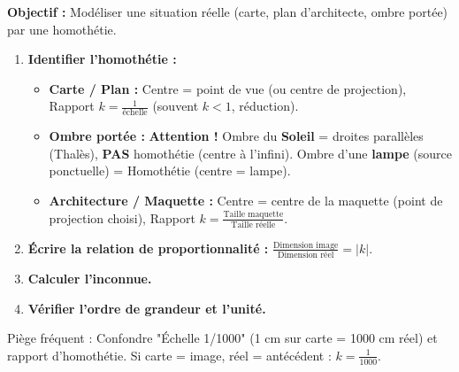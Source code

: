 \documentclass[11pt]{article}
\newcommand{\cle}[1]{{\popxbold\color{popdark}#1}}
\begin{document}
\begin{methode}
\textbf{Objectif :} Modéliser une situation réelle (carte, plan d'architecte, ombre portée) par une homothétie.
\begin{enumerate}
    \item \textbf{Identifier l'homothétie :}
    \begin{itemize}
        \item \textbf{Carte / Plan :} Centre = point de vue (ou centre de projection), Rapport $k = \frac{1}{\text{échelle}}$ (souvent $k < 1$, réduction).
        \item \textbf{Ombre portée :} \textbf{Attention !} Ombre du \textbf{Soleil} = droites parallèles (Thalès), \textbf{PAS} homothétie (centre à l'infini). Ombre d'une \textbf{lampe} (source ponctuelle) = Homothétie (centre = lampe).
        \item \textbf{Architecture / Maquette :} Centre = centre de la maquette (point de projection choisi), Rapport $k = \frac{\text{Taille maquette}}{\text{Taille réelle}}$.
    \end{itemize}
    \item \textbf{Écrire la relation de proportionnalité :} $\frac{\text{Dimension image}}{\text{Dimension réel}} = |k|$.
    \item \textbf{Calculer l'inconnue.}
    \item \textbf{Vérifier l'ordre de grandeur et l'unité.}
\end{enumerate}
\cle{Piège fréquent} : Confondre "Échelle 1/1000" (1 cm sur carte = 1000 cm réel) et rapport d'homothétie. Si carte = image, réel = antécédent : $k = \frac{1}{1000}$.
\end{methode}
\end{document}

